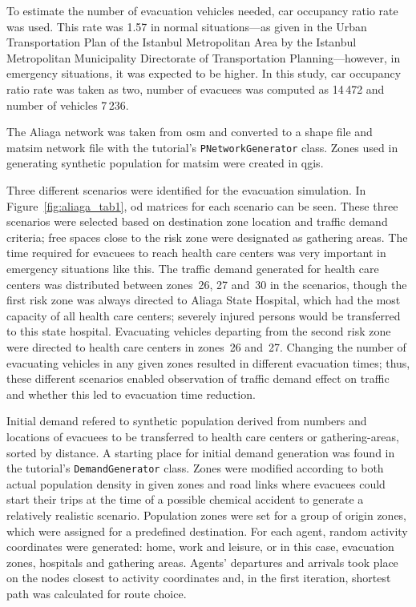 To estimate the number of evacuation vehicles needed, car occupancy ratio rate was used. This rate was 1.57 in normal situations---as given in the Urban Transportation Plan of the Istanbul Metropolitan Area by the Istanbul Metropolitan Municipality Directorate of Transportation Planning---however, in emergency situations, it was expected to be higher. In this study, car occupancy ratio rate was taken as two, number of evacuees was computed as 14\,472 and number of vehicles 7\,236.

The Aliaga network was taken from \gls{osm} and converted to a shape file and \gls{matsim} network file with the tutorial's \lstinline|PNetworkGenerator| class. %
Zones used in generating synthetic population for \gls{matsim} were created in \gls{qgis}.

Three different scenarios were identified for the evacuation simulation. In Figure~\ref{fig:aliaga_tab1}, \gls{od} matrices for each scenario can be seen. These three scenarios were selected based on destination zone location and traffic demand criteria; free spaces close to the risk zone were designated as gathering areas. The time required for evacuees to reach health care centers was very important in emergency situations like this. The traffic demand generated for health care centers 
was distributed between zones~26, 27 and~30 in the scenarios, though the first risk zone was always directed to Aliaga State Hospital, which had the most capacity of all health care centers; severely injured persons would be transferred to this state hospital. Evacuating vehicles departing from the second risk zone were directed to health care centers in zones~26 and~27. Changing the number of evacuating vehicles in any given zones resulted in different evacuation times; thus, these different scenarios enabled observation of traffic demand effect on traffic and whether this led to evacuation time reduction.

Initial demand refered to synthetic population derived from numbers and locations of evacuees to be transferred to health care centers or gathering-areas, sorted by distance. 
A starting place for initial demand generation was found in the tutorial's \lstinline|DemandGenerator| class. %
Zones were modified according to both actual population density in given zones and road links where evacuees could start their trips at the time of a possible chemical accident to generate a relatively realistic scenario. Population zones were set for a group of origin zones, which were assigned for a predefined destination. For each agent, random activity coordinates were generated: home, work and leisure, or in this case, evacuation zones, hospitals and gathering areas. Agents' departures and arrivals took place on the nodes closest to activity coordinates and, in the first iteration, shortest path was calculated for route choice.

